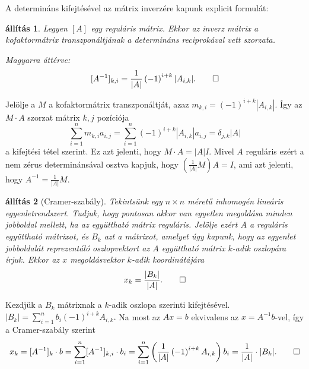 \documentclass[9pt, a4paper, showtrims]{memoir}
\makeatletter
\renewenvironment{proof}[1][\proofname]
    {\par\pushQED{\qed}%
    \normalfont \topsep6\p@\@plus6\p@\relax
    \trivlist
    \item[\hskip\labelsep
        \itshape
    #1\@addpunct{:}]\ignorespaces}
    {\popQED\endtrivlist\@endpefalse}
\theoremstyle{plain}
\newtheorem{proposition}{állítás}[chapter]
\theoremstyle{remark}
\theoremstyle{definition}
\makeatother
\begin{document}
A determináns kifejtésével az mátrix inverzére kapunk explicit formulát:
\begin{proposition}
	Legyen $[A]$ egy reguláris mátrix.
	Ekkor az inverz mátrix a kofaktormátrix transzponáltjának a determináns reciprokával vett szorzata.

	Magyarra áttérve:
	\[
		[A^{-1}]_{k,i}=\frac{1}{|A|}\left( -1 \right)^{i+k}|A_{i,k}|.\qedhere
	\]
\end{proposition}
\begin{proof}
	Jelölje a $M$ a kofaktormátrix transzponáltját,
	azaz $m_{k,i}=\left( -1 \right)^{i+k}|A_{i,k}|$.
	Így az $M\cdot A$ szorzat mátrix $k,j$ pozíciója
	\[
		\sum_{i=1}^nm_{k,i}a_{i,j}
		=
		\sum_{i=1}^n
		\left( -1 \right)^{i+k}|A_{i,k}|
		a_{i,j}
		=\delta_{j,k}|A|
	\]
	a kifejtési tétel szerint.
	Ez azt jelenti, hogy $M\cdot A=|A|I$.
	Mivel $A$ reguláris ezért a nem zérus determinánsával osztva kapjuk, hogy
	$\left(\frac{1}{|A|}M\right)A=I$,
	ami azt jelenti, hogy $A^{-1}=\frac{1}{|A|}M$.
\end{proof}
\begin{proposition}[Cramer-szabály]
	Tekintsünk egy $n\times n$ méretű inhomogén lineáris egyenletrendszert.
	Tudjuk, hogy pontosan akkor van egyetlen megoldása minden jobboldal mellett,
	ha az együttható mátrix reguláris.
	Jelölje  ezért $A$ a reguláris együttható mátrixot,
	és $B_k$ azt a mátrixot, amelyet úgy kapunk,
	hogy az egyenlet jobboldalát reprezentáló oszlopvektort az $A$ együttható mátrix $k$-adik
	oszlopára írjuk.
	Ekkor az $x$ megoldásvektor $k$-adik koordinátájára
	\[
		x_k=\frac{|B_k|}{|A|}.\qedhere
	\]
\end{proposition}
\begin{proof}
	Kezdjük a $B_k$ mátrixnak a $k$-adik oszlopa szerinti kifejtésével.
	\(
	|B_k|
	=
	\sum_{i=1}^nb_i\left( -1 \right)^{i+k}A_{i,k}.
	\)
	Na most az $Ax=b$ ekvivalens az $x=A^{-1}b$-vel,
	így a Cramer-szabály szerint
	\[
		x_k=[A^{-1}]_k\cdot b
		=
		\sum_{i=1}^n[A^{-1}]_{k,i}\cdot b_i
		=
		\sum_{i=1}^n\left( \frac{1}{|A|}\left( -1 \right)^{i+k}A_{i,k} \right)b_i
		=
		\frac{1}{|A|}\cdot |B_k|.\qedhere
	\]
\end{proof}
\end{document}
